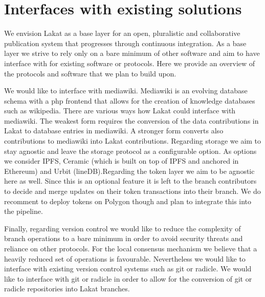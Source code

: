
\section{Interfaces with existing solutions}

We envision Lakat as a base layer for an open, pluralistic and collaborative publication system that progresses through continuous integration. As a base layer we strive to rely only on a bare minimum of other software and aim to have interface with for existing software or protocols. Here we provide an overview of the protocols and software that we plan to build upon. 

We would like to interface with mediawiki. Mediawiki is an evolving database schema with a php frontend that allows for the creation of knowledge databases such as wikipedia. There are various
ways how Lakat could interface with mediawiki. The weakest form requires the conversion of the data contributions in Lakat to database entries in mediawiki. A stronger form converts also contributions to mediawiki into Lakat contributions. Regarding storage we aim to stay agnostic and leave the storage protocol as a configurable option. As options we consider IPFS, Ceramic (which is built on top of IPFS and anchored in Ethereum) and Urbit (lineDB).Regarding the token layer we aim to be agnostic here as well. Since this is an optional feature it is left to the branch contributors to decide and merge updates on their token transactions into their branch. We do recomment to deploy tokens on Polygon though and plan to integrate this into the pipeline.

Finally, regarding version control we would like to reduce the complexity of branch operations to a bare minimum in order to avoid security threats and reliance on other protocols. For the local consensus mechanism we believe that a heavily reduced set of operations is favourable. Nevertheless we would like to interface with existing version control systems such as git or radicle. We would like to interface with git or radicle in order to allow for the conversion of git or radicle repositories into Lakat branches. 



